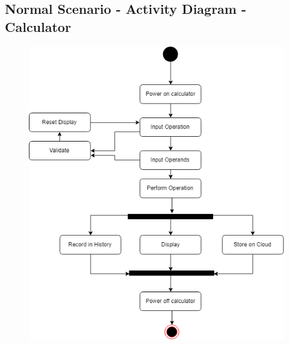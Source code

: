 \documentclass{article}
\begin{document}
\subsection{Normal Scenario - Activity Diagram - Calculator}
\begin{figure}[h!]
    \centering
    \includegraphics[scale=0.90]{Problem5_ActivityDiagram.png}
\end{figure}
\end{document}

